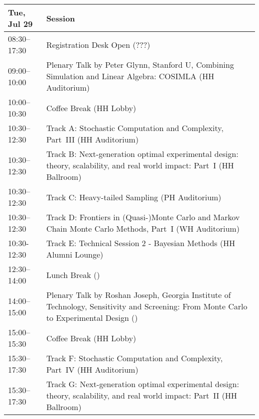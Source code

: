\begin{table}
{\footnotesize
\begin{tabularx}{\textwidth}{>{\hsize=0.32\hsize}X|>{\hsize=1.7\hsize}X}
\hline
\textbf{Tue, Jul 29} & \textbf{Session} \\
\hline
\cellcolor{\EmptyColor}08:30–17:30 & \cellcolor{\EmptyColor}Registration Desk Open (???) \\
\cellcolor{\PlenaryColor}09:00–10:00 & \cellcolor{\PlenaryColor}Plenary Talk by Peter Glynn, Stanford U, Combining Simulation and Linear Algebra: COSIMLA (HH Auditorium) \\
\cellcolor{\EmptyColor}10:00–10:30 & \cellcolor{\EmptyColor}Coffee Break (HH Lobby) \\
\cellcolor{\SessionTitleColor}10:30–12:30 & \cellcolor{\SessionTitleColor}Track A: Stochastic Computation and Complexity, Part~III (HH Auditorium) \\
\cellcolor{\SessionTitleColor}10:30–12:30 & \cellcolor{\SessionTitleColor}Track B: Next-generation optimal experimental design: theory, scalability, and real world impact: Part~I (HH Ballroom) \\
\cellcolor{\SessionTitleColor}10:30–12:30 & \cellcolor{\SessionTitleColor}Track C: Heavy-tailed Sampling (PH Auditorium) \\
\cellcolor{\SessionTitleColor}10:30–12:30 & \cellcolor{\SessionTitleColor}Track D: Frontiers in (Quasi-)Monte Carlo and Markov Chain Monte Carlo Methods, Part~I (WH Auditorium) \\
\cellcolor{\SessionLightColor}10:30-12:30 & \cellcolor{\SessionLightColor}Track E: Technical Session 2 - Bayesian Methods (HH Alumni Lounge) \\
\cellcolor{\EmptyColor}12:30–14:00 & \cellcolor{\EmptyColor}Lunch Break () \\
\cellcolor{\PlenaryColor}14:00–15:00 & \cellcolor{\PlenaryColor}Plenary Talk by Roshan Joseph, Georgia Institute of Technology, Sensitivity and Screening: From Monte Carlo to Experimental Design () \\
\cellcolor{\EmptyColor}15:00–15:30 & \cellcolor{\EmptyColor}Coffee Break (HH Lobby) \\
\cellcolor{\SessionTitleColor}15:30–17:30 & \cellcolor{\SessionTitleColor}Track F: Stochastic Computation and Complexity, Part~IV (HH Auditorium) \\
\cellcolor{\SessionTitleColor}15:30–17:30 & \cellcolor{\SessionTitleColor}Track G: Next-generation optimal experimental design: theory, scalability, and real world impact: Part~II (HH Ballroom) \\

\end{tabularx}}
\end{table}
